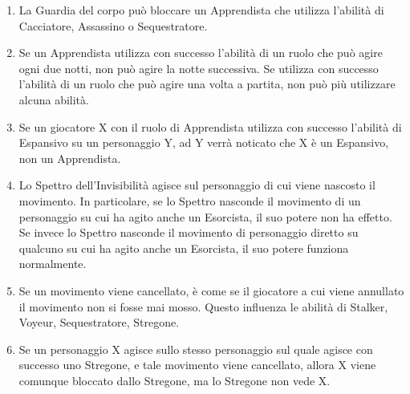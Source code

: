 \documentclass[a4paper,10pt]{article}
\begin{document}
\begin{enumerate}
	\item La Guardia del corpo può bloccare un Apprendista che utilizza l'abilità di Cacciatore, Assassino o Sequestratore.

	\item Se un Apprendista utilizza con successo l'abilità di un ruolo che può agire ogni due notti, non può agire la notte successiva. Se utilizza con successo l'abilità di un ruolo che può agire una volta a partita, non può più utilizzare alcuna abilità.

	\item Se un giocatore X con il ruolo di Apprendista utilizza con successo l'abilità di Espansivo su un personaggio Y, ad Y verrà noticato che X è un Espansivo, non un Apprendista.
	
	\item Lo Spettro dell'Invisibilità agisce sul personaggio di cui viene nascosto il movimento. In particolare, se lo Spettro nasconde il movimento di un personaggio su cui ha agito anche un Esorcista, il suo potere non ha effetto. Se invece lo Spettro nasconde il movimento di personaggio diretto su qualcuno su cui ha agito anche un Esorcista, il suo potere funziona normalmente.
	
	

	\item Se un movimento viene cancellato, è come se il giocatore a cui viene annullato il movimento non si fosse mai mosso. Questo influenza le abilità di Stalker, Voyeur, Sequestratore, Stregone.

	\item Se un personaggio X agisce sullo stesso personaggio sul quale agisce con successo uno Stregone, e tale movimento viene cancellato, allora X viene comunque bloccato dallo Stregone, ma lo Stregone non vede X.
	

\end{enumerate}
\end{document}
